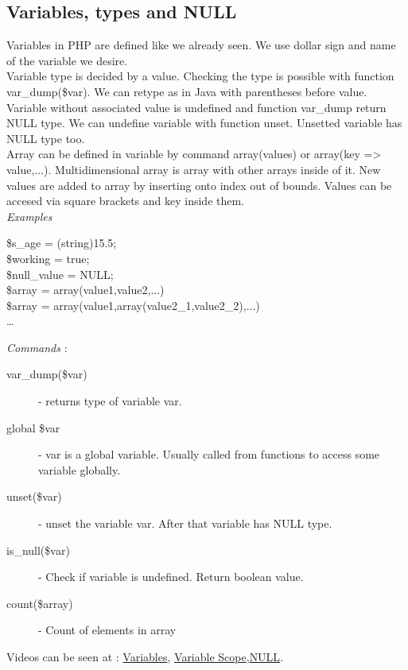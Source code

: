 \documentclass{article}
\begin{document}
\subsection{Variables, types and NULL}
Variables in PHP are defined like we already seen. We use dollar sign
and name of the variable we desire.\\
Variable type is decided by a value. Checking the type is possible with
function var\_dump(\$var). We can retype as in Java with parentheses before value. \\ 
Variable without associated value is undefined and function
var\_dump return NULL type. We can undefine variable with function
unset. Unsetted variable has NULL type too.\\
Array can be defined in variable by command array(values) or array(key => value,...). Multidimensional array is array with other arrays inside of it. New values are added to array by inserting onto index out of bounds. Values can be accesed via square brackets and key inside them.\\
\textit{Examples}
\begin{description}
\item[\hspace{1cm} \$s\_age = (string)15.5;]
\item[\hspace{1cm} \$working = true;]
\item[\hspace{1cm} \$null\_value = NULL;]
\item[\hspace{1cm} \$array = array(value1,value2,...)]
\item[\hspace{1cm} \$array = array(value1,array(value2\_1,value2\_2),...)]
\item[\hspace{1cm} \dots]
\end{description} 
\hfill\newline
\textit{Commands} :
\begin{description}
\item[\hspace{1cm} var\_dump(\$var)] - returns type of variable var.
\item[\hspace{1cm} global \$var] - var is a global variable. Usually called from functions to access some variable globally.
\item[\hspace{1cm} unset(\$var)] - unset the variable var. After that variable has NULL type. 
\item[\hspace{1cm} is\_null(\$var)] - Check if variable is undefined. Return boolean value.
\item[\hspace{1cm} count(\$array)] - Count of elements in array
\end{description}
Videos can be seen at : \href{http://youtu.be/6MxUGGEcDB4}{Variables}, \href{http://youtu.be/0p6YgVpU6OU}{Variable Scope},\href{http://youtu.be/VY8fRzKUb2Q}{NULL}.
\end{document}
